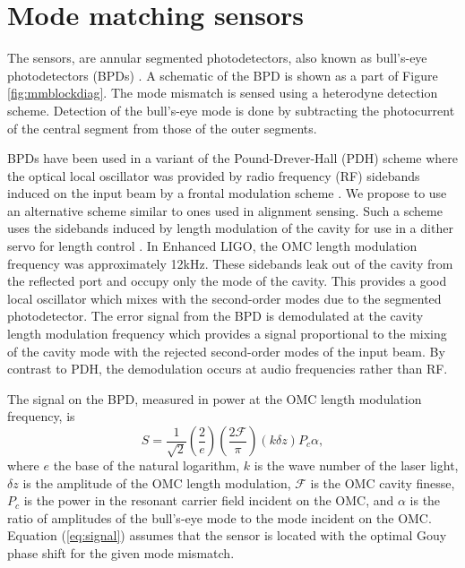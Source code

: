\section{Mode matching sensors}
The sensors, are annular segmented photodetectors, also known as bull's-eye photodetectors (BPDs) \cite{Mueller:00}. %
A schematic of the BPD is shown as a part of Figure \ref{fig:mmblockdiag}. %
The mode mismatch is sensed using a heterodyne detection scheme. %
Detection of the bull's-eye mode is done by subtracting the photocurrent of the central segment from those of the outer segments. %


BPDs have been used in a variant of the Pound-Drever-Hall (PDH) scheme where the optical local oscillator was provided by radio frequency (RF) sidebands induced on the input beam by a frontal modulation scheme \cite{Mueller:00}. %
We propose to use an alternative scheme similar to ones used in alignment sensing. %
Such a scheme uses the sidebands induced by length modulation of the cavity for use in a dither servo for length control \cite{kwee:07}. %
In Enhanced LIGO, the OMC length modulation frequency was approximately 12kHz. %
These sidebands leak out of the cavity from the reflected port and occupy only the  mode of the cavity. %
This provides a good local oscillator which mixes with the second-order modes due to the segmented photodetector. %
The error signal from the BPD is demodulated at the cavity length modulation frequency which provides a signal proportional to the mixing of the  cavity mode with the rejected second-order modes of the input beam. %
By contrast to PDH, the demodulation occurs at audio frequencies rather than RF.

The signal on the BPD, measured in power at the OMC length modulation frequency, is\cite{Sigg:00,ModalModelUpdate4}
\begin{equation}
\label{eq:signal}
S = \frac{1}{\sqrt 2}\left(\frac{2}{e}\right)\left(\frac{2 \mathcal{F}}{\pi}\right)\left(k \delta z\right) P_c \alpha,
\end{equation}
where $e$ the base of the natural logarithm, $k$ is the wave number of the laser light, $\delta z$ is the amplitude of the OMC length modulation, $\mathcal{F}$ is the OMC cavity finesse, $P_c$ is the power in the resonant carrier field incident on the OMC, and $\alpha$ is the ratio of amplitudes of the bull's-eye mode to the  mode incident on the OMC. %
Equation (\ref{eq:signal}) assumes that the sensor is located with the optimal Gouy phase shift for the given mode mismatch.

